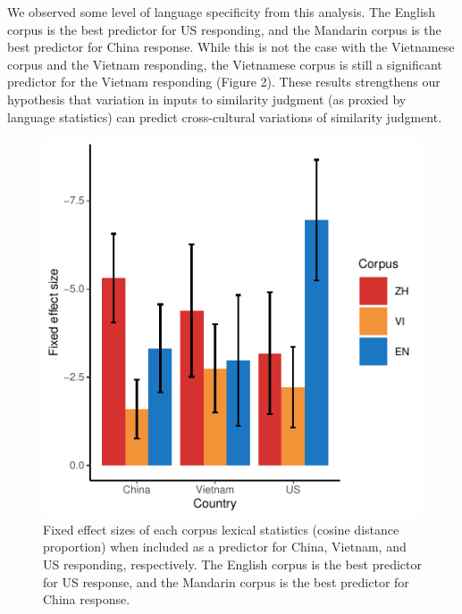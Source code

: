 \documentclass[10pt, letterpaper]{article}
\newenvironment{CodeChunk}{}{}
\begin{document}
We observed some level of language specificity from this analysis. The
English corpus is the best predictor for US responding, and the Mandarin
corpus is the best predictor for China response. While this is not the
case with the Vietnamese corpus and the Vietnam responding, the
Vietnamese corpus is still a significant predictor for the Vietnam
responding (Figure 2). These results strengthens our hypothesis that
variation in inputs to similarity judgment (as proxied by language
statistics) can predict cross-cultural variations of similarity
judgment.

\begin{CodeChunk}
\begin{figure}[tb]

{\centering \includegraphics{figs/coeffs_cos-1} 

}

\caption[Fixed effect sizes of each corpus lexical statistics (cosine distance proportion) when included as a predictor for China, Vietnam, and US responding, respectively]{Fixed effect sizes of each corpus lexical statistics (cosine distance proportion) when included as a predictor for China, Vietnam, and US responding, respectively. The English corpus is the best predictor for US response, and the Mandarin corpus is the best predictor for China response.}\label{fig:coeffs_cos}
\end{figure}
\end{CodeChunk}
\end{document}

